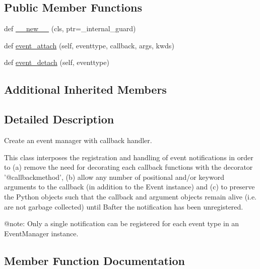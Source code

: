 \subsection*{Public Member Functions}
\begin{DoxyCompactItemize}
\item 
def \hyperlink{classvlc_1_1_event_manager_a2ed91930af7622fec54ade5b2d4b2315}{\+\_\+\+\_\+new\+\_\+\+\_\+} (cls, ptr=\+\_\+internal\+\_\+guard)
\item 
def \hyperlink{classvlc_1_1_event_manager_a969b667ff0326d1baa70343bc882c29d}{event\+\_\+attach} (self, eventtype, callback, args, kwds)
\item 
def \hyperlink{classvlc_1_1_event_manager_a9163e98110a74e53366cecc73ac10a55}{event\+\_\+detach} (self, eventtype)
\end{DoxyCompactItemize}
\subsection*{Additional Inherited Members}


\subsection{Detailed Description}
\begin{DoxyVerb}Create an event manager with callback handler.

This class interposes the registration and handling of
event notifications in order to (a) remove the need for
decorating each callback functions with the decorator
'@callbackmethod', (b) allow any number of positional
and/or keyword arguments to the callback (in addition
to the Event instance) and (c) to preserve the Python
objects such that the callback and argument objects
remain alive (i.e. are not garbage collected) until
B{after} the notification has been unregistered.

@note: Only a single notification can be registered
for each event type in an EventManager instance.\end{DoxyVerb}
 

\subsection{Member Function Documentation}
\mbox{\label{classvlc_1_1_event_manager_a2ed91930af7622fec54ade5b2d4b2315}} 
